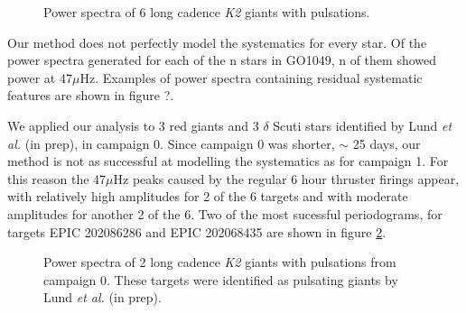 \documentclass[useAMS, usenatbib]{aastex}
\begin{document}
\begin{figure}
\begin{center}
{        }
    \end{center}
    \caption{Power spectra of 6 long cadence {\it K2} giants with pulsations.
\label{fig:astero_examples}}
\end{figure}

Our method does not perfectly model the systematics for every star.
Of the power spectra generated for each of the n stars in GO1049, n of them
showed power at 47$\mu$Hz.
Examples of power spectra containing residual systematic features are shown in
figure ?.

We applied our analysis to 3 red giants and 3 $\delta$ Scuti stars
identified by Lund {\it et al.} (in prep), in campaign 0.
Since campaign 0 was shorter, $\sim$ 25 days, our method is not as successful
at modelling the systematics as for campaign 1.
For this reason the 47$\mu$Hz peaks caused by the regular 6 hour thruster
firings appear, with relatively high amplitudes for 2 of the 6 targets and with
moderate amplitudes for another 2 of the 6.
Two of the most sucessful periodograms, for targets EPIC 202086286 and EPIC
202068435 are shown in figure \ref{fig:c0}.

\begin{figure}
\begin{center}
    \end{center}
    \caption{Power spectra of 2 long cadence {\it K2} giants with
	    pulsations from campaign 0. These targets were identified as
	    pulsating giants by Lund {\it et al.} (in prep).
\label{fig:c0}}
\end{figure}
\end{document}
